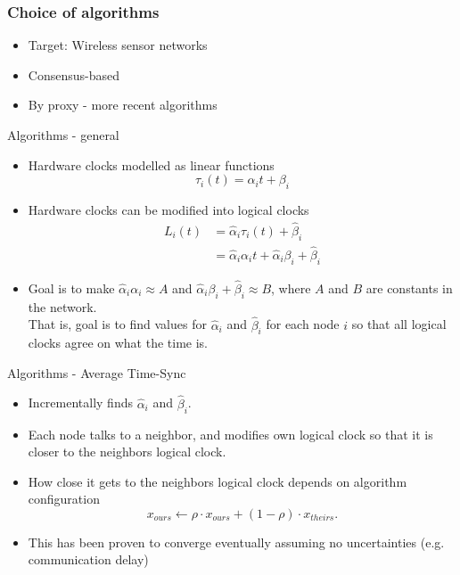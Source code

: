 \documentclass{beamer}
\begin{document}
\begin{frame}
    \frametitle{Choice of algorithms}
    \begin{itemize}
        \item Target: Wireless sensor networks
        \item Consensus-based
        \item By proxy - more recent algorithms
    \end{itemize}
\end{frame}
 
\begin{frame}{Algorithms - general}
    \begin{itemize}
        \item Hardware clocks modelled as linear functions $$ \tau_i(t) = \alpha_i t + \beta_i $$
        \item Hardware clocks can be modified into logical clocks
        \begin{align*}
            L_i(t) &= \hat{\alpha}_i \tau_i(t) + \hat{\beta}_i \\
                    &= \hat{\alpha}_i \alpha_i t + \hat{\alpha}_i \beta_i + \hat{\beta}_i
        \end{align*}
        \item Goal is to make $\hat{\alpha}_i \alpha_i \approx A$ and $\hat{\alpha}_i \beta_i + \hat{\beta}_i \approx B$, where $A$ and $B$ are constants in the network.\\
        That is, goal is to find values for $\hat{\alpha}_i$ and $\hat{\beta}_i$ for each node $i$ so that all logical clocks agree on what the time is.
    \end{itemize}
\end{frame}

\begin{frame}{Algorithms - Average Time-Sync}
    \begin{itemize}
        \item Incrementally finds $\hat{\alpha}_i$ and $\hat{\beta}_i$.
        \item Each node talks to a neighbor, and modifies own logical clock so that it is closer to the neighbors logical clock.
        \item How close it gets to the neighbors logical clock depends on algorithm configuration
        $$ x_{ours} \leftarrow \rho \cdot x_{ours} + (1 - \rho) \cdot x_{theirs}. $$
        \item This has been proven to converge eventually assuming no uncertainties (e.g. communication delay) \cite{LucaFiorentin11}
    \end{itemize}
\end{frame}
\end{document}

